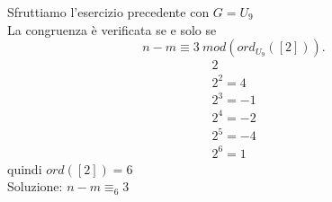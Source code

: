 \documentclass[12px]{article}
\begin{document}
    Sfruttiamo l'esercizio precedente con $G = U_9$ \\
    La congruenza è verificata se e solo se
    \[
	    n - m \equiv 3 \ mod(ord_{U_9}([2]))
    .\] 
    \begin{gather*}
    	2\\
	2^2 = 4\\
	2^3 = -1\\
	2^4 = -2\\
	2^5 = -4\\
	2^6 = 1
    \end{gather*}
    quindi $ord([2]) = 6$\\
    Soluzione: $n-m \equiv_6 3$
\end{document}
